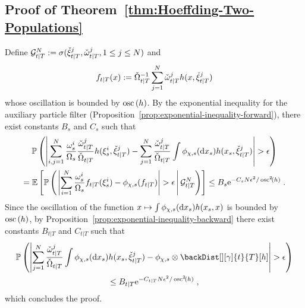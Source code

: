 \label{sec:proofs}
\subsection{Proof of Theorem~\ref{thm:Hoeffding-Two-Populations}}
\label{proof:thm:Hoeffding-Two-Populations}
Define $\mathcal{G}^N_{t|T} := \sigma({\check{\xi}}_{t|T}^{j},{\check{\omega}}_{t|T}^{j}, 1\leq j \leq N)$ and
$$
f_{t|T}(x) \eqdef  \backsumwght{t}{T}^{-1}\sum_{j=1}^N\ebackwght{t}{T}{j}h(x,\ebackpart{t}{T}{j})
$$
whose oscillation is bounded by $\oscnorm{h}$. By the exponential inequality for the  auxiliary particle filter (Proposition~\ref{prop:exponential-inequality-forward}), there exist constants $B_{s}$ and $C_{s}$ such that
\begin{multline}\label{eq:inegExpoBack2}
\PP\left( \left| \sum_{i,j=1}^N \frac{\swght{s}{i}}{\sumwght{s}}\frac{\ebackwght{t}{T}{j}}{\backsumwght{t}{T}} h(\epartpred{s}{i},\ebackpart{t}{T}{j}) -\sum_{j=1}^N \frac{\ebackwght{t}{T}{j}}{\backsumwght{t}{T}} \int \filt{\Xinit,s}(\rmd x_s)h(x_s,\ebackpart{t}{T}{j})   \right| > \epsilon \right)\\
=\PE\left[ \CPP{\left|\sum_{i=1}^N \frac{\swght{s}{i}}{\sumwght{s}} f_{t|T}(\epartpred{s}{i})-\filt{\Xinit,s}(f_{t|T})\right|>\epsilon}{\mathcal{G}^N_{t|T}}\right]\leq  B_{s} \rme^{-C_{s} N \epsilon^2 / \oscnorm[2]{h}}\eqsp.
\end{multline}
Since the oscillation of the function $x \mapsto \int  \filt{\Xinit,s}(\rmd x_s)h(x_s,x)$ is bounded by $\oscnorm{h}$, by Proposition~\ref{prop:exponential-inequality-backward} there exist constants $B_{t|T}$ and $C_{t|T}$
such that
\begin{multline}
\label{eq:inegExpoBack1}
\PP\left(  \left| \sum_{j=1}^N \frac{\ebackwght{t}{T}{j}}{\backsumwght{t}{T}} \int \filt{\Xinit,s}(\rmd x_s)h(x_s,\ebackpart{t}{T}{j})  - \filt{\Xinit,s}\otimes \backDist[][\gamma]{t}{T}[h] \right|> \epsilon \right)\\
\leq  B_{t|T} \rme^{-C_{t|T} N \epsilon^2/\oscnorm[2]{h}}\eqsp,
\end{multline}
which concludes the proof.
